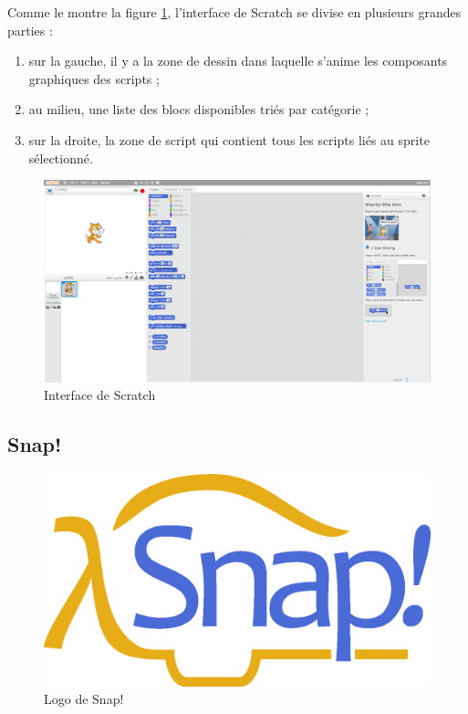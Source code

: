 Comme le montre la figure \ref{fig:scratch-printscreen}, l'interface de Scratch se divise en plusieurs grandes parties :

\begin{enumerate}
\item sur la gauche, il y a la zone de dessin dans laquelle s'anime les composants graphiques des \glspl{script} ;
\item au milieu, une liste des \glspl{bloc} disponibles triés par catégorie ;
\item sur la droite, la zone de \gls{script} qui contient tous les \glspl{script} liés au \gls{sprite} sélectionné.
\end{enumerate}

\begin{figure}
  \begin{center}
    \includegraphics[width=\textwidth]{content/5-related_work/images/scratch-printscreen}
    \caption{Interface de Scratch}
    \label{fig:scratch-printscreen}
  \end{center}
\end{figure}

\subsection{Snap!}

\begin{figure}[!ht]
  \begin{center}
    \includegraphics[scale=0.07]{content/5-related_work/images/snap}
    \caption{Logo de Snap!}
    \label{fig:snap}
  \end{center}
\end{figure}

